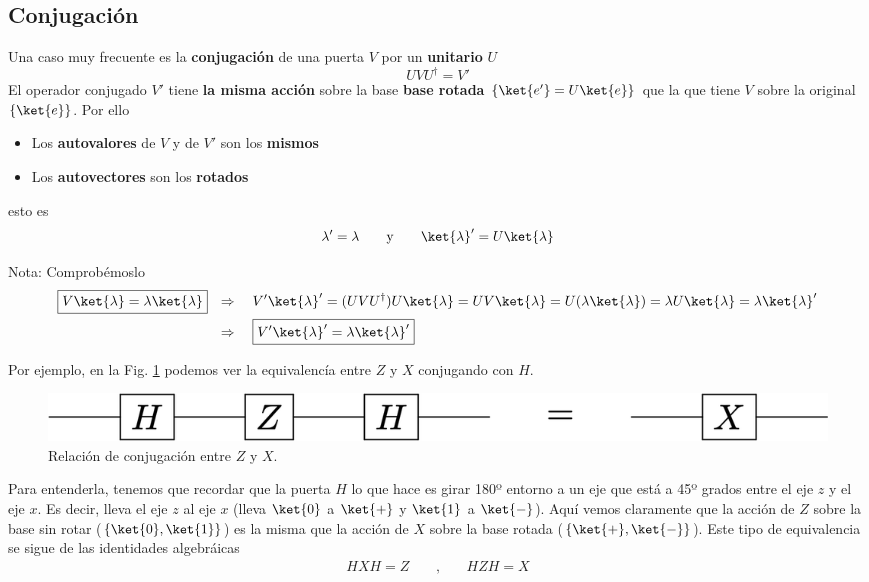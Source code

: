\documentclass[a4paper,11pt]{book} %
\numberwithin{equation}{chapter}
\def\lch{\left\{}
\def\rch{\right\}}
\begin{document}
        \subsection{Conjugación}

Una caso muy frecuente es la \textbf{conjugación} de una puerta $V$  por un \textbf{unitario} $U$
	\begin{equation}
	U V   U^\dagger = V'  
	\end{equation}
El operador conjugado $V'$ tiene \textbf{la misma acción} sobre la base \textbf{base rotada} $\{\ket{e'} = U\ket{e}\}$ que la que tiene $V$ sobre la original $\{\ket{e}\}$. Por ello
\begin{itemize}
	\item Los \textbf{autovalores} de $V$ y de $V'$ son los \textbf{mismos}
	\item Los \textbf{autovectores} son los \textbf{rotados}
\end{itemize}
esto es
$$
\lambda' = \lambda ~~~~~~\hbox{y}~~~~~~  \ket{\lambda}' = U\ket{\lambda}
$$

	\begin{mybox_blue}{Nota: Comprobémoslo}
	\begin{align*}
	\boxed{V \ket{\lambda}= \lambda\ket{\lambda}} & ~~ \Rightarrow ~~~V'\ket{\lambda}' =
	 (UVU^\dagger) U\ket{\lambda} = UV\ket{\lambda} =  U(\lambda\ket{\lambda}) = 
	 \lambda U\ket{\lambda} = \lambda\ket{\lambda}' \\ 
	 & ~~\Rightarrow ~~~ \boxed{ V' \ket{\lambda}' 
	 = \lambda\ket{\lambda}'}
	\end{align*}
	\end{mybox_blue}

Por ejemplo, en la Fig. \ref{Fig_elementos_H_conjugation} podemos ver la equivalencía entre $Z$ y $X$ conjugando con $H$. 
	\begin{figure}[H]
	\centering 
	\includegraphics[width=0.5\linewidth]{Figuras/Fig_elementos_H_conjugation}
	\caption{Relación de conjugación entre $Z$ y $X$.}
	\label{Fig_elementos_H_conjugation}
	\end{figure}
Para entenderla, tenemos que recordar que  la puerta $H$ lo que hace es girar 180º entorno a un eje que está a 45º grados entre el eje $z$ y el eje $x$. Es decir, lleva el eje $z$ al eje $x$ (lleva $\ket{0}$ a $\ket{+}$ y $\ket{1}$ a $\ket{-}$). Aquí vemos claramente que la acción de $Z$ sobre la base sin rotar ($\lch \ket{0}, \ket{1} \rch$) es la misma que la acción de $X$ sobre la base rotada ($\lch \ket{+},\ket{-} \rch $). Este tipo de equivalencia se sigue de las identidades algebráicas
\begin{eqnarray}
HXH = Z ~~~~~&,&~~ ~~~
HZH = X \nonumber
\end{eqnarray}
\end{document}
